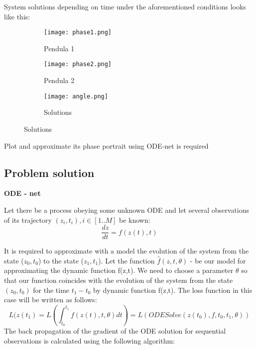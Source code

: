 \documentclass{article}
\begin{document}
System solutions depending on time under the aforementioned conditions looks like this: \\
\begin{figure}[h]
     \centering
     \begin{subfigure}[b]{0.46\textwidth}
         \centering
         \texttt{[image: phase1.png]}
         \caption{Pendula 1}
         \label{fig:y equals x}
     \end{subfigure}
     \hfill
     \begin{subfigure}[b]{0.46\textwidth}
         \centering
         \texttt{[image: phase2.png]}
         \caption{Pendula 2}
         \label{fig:three sin x}
     \end{subfigure}
     \hfill
     \begin{subfigure}[b]{0.45\textwidth}
         \centering
         \texttt{[image: angle.png]}
         \caption{Solutions}
         \label{fig:five over x}
     \end{subfigure}
        \label{fig:three graphs}
\end{figure}


Plot and approximate its phase portrait  using ODE-net is required

\newpage

\subsection*{Problem solution}
\textbf{ODE - net}

Let there be a process obeying some unknown ODE and let several observations of its trajectory $(z_i, t_i), i \in [1..M]$ be known:
\begin{equation}
    \frac{dz}{dt} = f(z(t), t)
\end{equation}

It is required to approximate with a model the evolution of the system from the state ($z_0, t_0$) to the state ($z_1, t_1$). Let the function $\hat{f}(z, t, \theta)$ - be our model for approximating the dynamic function f(z,t). We need to choose a parameter $\theta$ so that our function coincides with the evolution of the system from the state $(z_0, t_0)$ for the time $t_1-t_0$ by dynamic function f(z,t). The loss function in this case will be written as follows: \\
\begin{equation}
    L(z(t_1) = L(\int^{t_1}_{t_0} f(z(t), t, \theta) dt) = L(ODESolve(z(t_0), f, t_0, t_1, \theta))
\end{equation}
The back propagation of the gradient of the ODE solution for sequential observations is calculated using the following algorithm: \\
\end{document}

